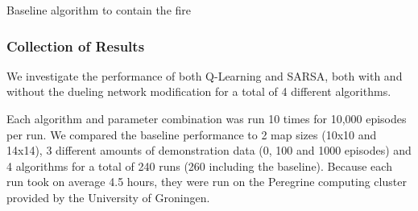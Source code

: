 \begin{algorithm}
  \caption{Baseline algorithm to contain the fire}
  \label{alg:baseline}
  \begin{algorithmic}[1]
    \EndIf
    \EndWhile
    \State {}
    \EndProcedure
  \end{algorithmic}
\end{algorithm}

\subsubsection{Collection of Results}\label{sec:datacollection}
We investigate the performance of both Q-Learning and SARSA, both with and without the dueling network modification for a total of 4 different algorithms.

Each algorithm and parameter combination was run 10 times for 10,000 episodes per run. We compared the baseline performance to 2 map sizes (10x10 and 14x14), 3 different amounts of demonstration data (0, 100 and 1000 episodes) and 4 algorithms for a total of 240 runs (260 including the baseline). Because each run took on average 4.5 hours, they were run on the Peregrine computing cluster provided by the University of Groningen.
